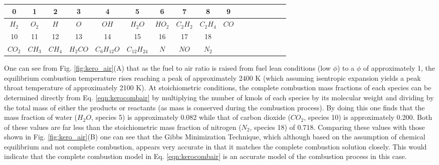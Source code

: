 \begin{table}[h]
\begin{center}
\begin{threeparttable}


\begin{tabular}{ccccccccccccccccc}
\toprule
0 & 1 & 2 & 3 & 4 & 5 & 6 & 7 & 8 & 9\\
\midrule
$H_2$ & $O_2$ & $H$ & $O$ & $OH$ & $H_2O$ & $HO_2$ & $C_2H_2$ & $C_2H_4$ & $CO$ \\ 

\midrule
10 & 11 & 12 & 13 & 14 & 15 & 16 & 17 & 18\\
\midrule
$CO_2$ & $CH_3$ & $CH_4$ & $H_2CO$ & $C_6H_{12}O$ & $C_{12}H_{24}$ & $N$ & $NO$ & $N_2$\\
\bottomrule
\end{tabular}


\label{table:spmapair}
\end{threeparttable}
\end{center}
\end{table}

	One can see from Fig. \ref{fig:kero_air}(A) that as the fuel to air ratio is raised from 
fuel lean conditions (low $\phi$) to 
a $\phi$ of approximately 1, the equilibrium combustion temperature rises reaching
a peak of approximately 2400 K (which assuming isentropic expansion yields a peak throat temperature
of approximately 2100 K).  At stoichiometric conditions, the complete combustion mass fractions of each species
can be determined directly from Eq. \ref{eqn:kerocombair} by multiplying the number of kmols of each
species by its molecular weight and dividing by the total mass of either the products or reactants 
(as mass is conserved during the combustion process).  By doing this one finds that the mass fraction
of water ($H_2O$, species 5) is approximately 0.082 while that of carbon dioxide ($CO_2$, species 10) is
approximately 0.200.  Both of these values are far less than the stoichiometric mass fraction of
nitrogen ($N_2$, species 18) of 0.718.  Comparing these values with those shown in Fig. \ref{fig:kero_air}(B)
one can see that the Gibbs Minimization Technique, which although based on the assumption of chemical 
equilibrium and not complete combustion, appears very accurate in that it matches the complete combustion
solution closely.  This would indicate that the complete combustion model in Eq. \ref{eqn:kerocombair}
is an accurate model of the combustion process in this case.


